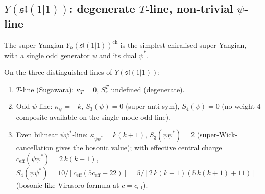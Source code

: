 \subsection{\texorpdfstring{$Y(\mathfrak{sl}(1|1))$}{Y(sl(1|1))}: degenerate \texorpdfstring{$T$}{T}-line, non-trivial \texorpdfstring{$\psi$}{psi}-line}
\label{sec:sl11-closed-form}

The super-Yangian $Y_\hbar(\mathfrak{sl}(1|1))^{\mathrm{ch}}$ is the
simplest chiralised super-Yangian, with a single odd generator
$\psi$ and its dual $\psi^*$.

\begin{theorem}
\label{thm:sl11-closed-forms}
On the three distinguished lines of $Y(\mathfrak{sl}(1|1))$:
\begin{enumerate}[label=\textup{(\alph*)},nosep]
\item $T$-line (Sugawara): $\kappa_T = 0$, $S_r^T$ undefined
 (degenerate).
\item Odd $\psi$-line: $\kappa_\psi = -k$,
 $S_3(\psi) = 0$ (super-anti-sym), $S_4(\psi) = 0$ (no
 weight-$4$ composite available on the single-mode odd line).
\item Even bilinear $\psi\psi^\ast$-line: $\kappa_{\psi\psi^\ast} = k(k+1)$,
 $S_3(\psi\psi^\ast) = 2$ (super-Wick-cancellation gives the bosonic
 value); with effective central charge
 $c_{\mathrm{eff}}(\psi\psi^\ast) = 2\, k(k+1)$,
 $S_4(\psi\psi^\ast) = 10 / [c_{\mathrm{eff}}(5 c_{\mathrm{eff}} + 22)]
 = 5 / [2\,k(k+1)(5\,k(k+1) + 11)]$ (bosonic-like Virasoro formula at
 $c = c_{\mathrm{eff}}$).
\end{enumerate}
\end{theorem}

